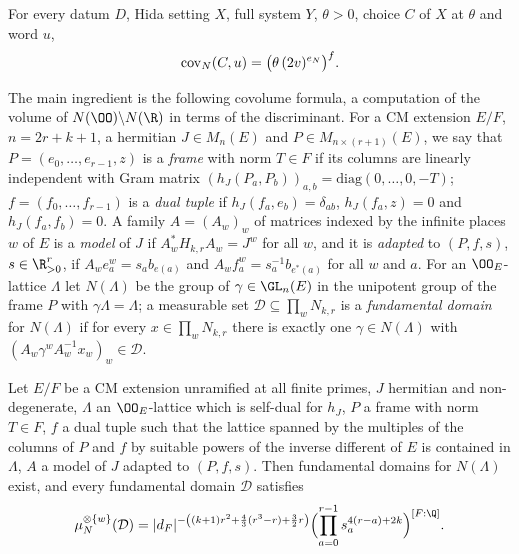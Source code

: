 \begin{theorem}\label{pf:sh-flag:covn}
For every datum $D$, Hida setting $X$, full system $Y$, $\theta>0$, choice $C$ of $X$ at $\theta$ and word $u$,
\[
\operatorname{cov}_N(C,u)=\bigl(\theta\,(2v)^{e_N}\bigr)^{f} .
\]
\end{theorem}

The main ingredient is the following covolume formula, a computation of the volume of $N(\OO)\backslash N(\R)$ in terms
of the discriminant. For a CM extension $E/F$, $n=2r+k+1$, a hermitian $J\in M_n(E)$ and $P\in M_{n\times(r+1)}(E)$, we say
that $P=(e_0,\dots,e_{r-1},z)$ is a \emph{frame} with norm $T\in F$ if its columns are linearly independent with Gram
matrix $(h_J(P_a,P_b))_{a,b}=\mathrm{diag}(0,\dots,0,-T)$; $f=(f_0,\dots,f_{r-1})$ is a \emph{dual tuple} if $h_J(f_a,e_b)=\delta_{ab}$,
$h_J(f_a,z)=0$ and $h_J(f_a,f_b)=0$. A family $A=(A_w)_w$ of matrices indexed by the infinite places $w$ of $E$ is a
\emph{model} of $J$ if $A_w^*H_{k,r}A_w=J^w$ for all $w$, and it is \emph{adapted} to $(P,f,s)$, $s\in\R_{>0}^r$, if
$A_we_a^w=s_ab_{e(a)}$ and $A_wf_a^w=s_a^{-1}b_{e^*(a)}$ for all $w$ and $a$. For an $\OO_E$-lattice $\Lambda$ let
$N(\Lambda)$ be the group of $\gamma\in\GL_n(E)$ in the unipotent group of the frame $P$ with $\gamma\Lambda=\Lambda$; a
measurable set $\mathcal D\subseteq\prod_wN_{k,r}$ is a \emph{fundamental domain} for $N(\Lambda)$ if for every
$x\in\prod_wN_{k,r}$ there is exactly one $\gamma\in N(\Lambda)$ with $(A_w\gamma^wA_w^{-1}x_w)_w\in\mathcal D$.

\begin{proposition}\label{pf:sh-flag:covnprop}
Let $E/F$ be a CM extension unramified at all finite primes, $J$ hermitian and non-degenerate, $\Lambda$ an
$\OO_E$-lattice which is self-dual for $h_J$, $P$ a frame with norm $T\in F$, $f$ a dual tuple such that the lattice
spanned by the multiples of the columns of $P$ and $f$ by suitable powers of the inverse different of $E$ is contained in
$\Lambda$, $A$ a model of $J$ adapted to $(P,f,s)$. Then fundamental domains for $N(\Lambda)$ exist, and every
fundamental domain $\mathcal D$ satisfies
\[
\mu_N^{\otimes\{w\}}(\mathcal D)=|d_F|^{-\left((k+1)r^2+\frac43(r^3-r)+\frac32r\right)}
\Bigl(\prod_{a=0}^{r-1}s_a^{4(r-a)+2k}\Bigr)^{[F:\Q]} .
\]
\end{proposition}

